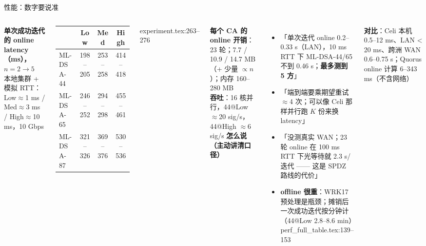 \documentclass[aspectratio=169,10pt,fontset=none]{ctexbeamer}
\newcommand{\src}[1]{{\scriptsize\color{gray}#1}}
\begin{document}
\begin{frame}{性能：数字要说准}
\begin{columns}[T]
\textbf{单次成功迭代的 online latency（ms），$n=2\to5$}\\
{\scriptsize 本地集群 + 模拟 RTT：Low$\approx$1 ms / Med$\approx$3 ms / High$\approx$10 ms，10 Gbps}\\[2pt]
\begin{tabular}{@{}lccc@{}}\toprule
 & Low & Med & High \\\midrule
ML-DSA-44 & 198--205 & 253--258 & 414--418 \\
ML-DSA-65 & 246--252 & 294--298 & 455--461 \\
ML-DSA-87 & 321--326 & 369--376 & \alert{530--536} \\\bottomrule
\end{tabular}
\src{experiment.tex:263--276}
\vspace{.4em}

\textbf{每个 CA 的 online 开销}：23 轮；7.7 / 10.9 / 14.7 MB（+ 少量 $\propto n$）；内存 160--280 MB\\
\textbf{吞吐}：16 核并行，44@Low $\approx$20 sig/s，44@High $\approx$6 sig/s
\textbf{怎么说（主动讲清口径）}
\begin{itemize}
  \item 「单次迭代 online 0.2--0.33 s（LAN），10 ms RTT 下 ML-DSA-44/65 不到 0.46 s；\textbf{最多测到 5 方}」
  \item 「端到端要乘期望重试 $\approx$4 次；可以像 Celi 那样并行跑 $K$ 份来换 latency」
  \item 「没测真实 WAN；23 轮 online 在 100 ms RTT 下光等待就 2.3 s/迭代 —— 这是 SPDZ 路线的代价」
  \item \textbf{offline 很重}：WRK17 预处理是瓶颈；摊销后一次成功迭代按\alert{分钟}计（44@Low 2.8--8.6 min）\src{perf\_full\_table.tex:139--153}
\end{itemize}
\textbf{对比}：Celi 本机 0.5--12 ms、LAN < 20 ms、跨洲 WAN 0.6--0.75 s；Quorus online 计算 6--343 ms（不含网络）
\end{columns}
\end{frame}
\end{document}
